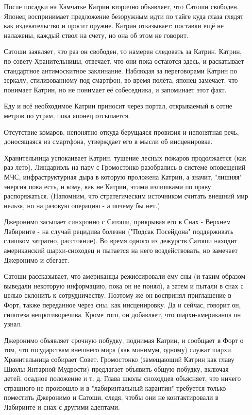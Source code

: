 {{После посадки на Камчатке Катрин вторично объявляет, что Сатоши свободен. Японец воспринимает предложение безоружным идти по тайге куда глаза глядят как издевательство и просит оружие. Катрин отказывает: поставки ещё не налажены, каждый ствол на счету, но она об этом не говорит.

Сатоши заявляет, что раз он свободен, то намерен следовать за Катрин. Катрин, по совету Хранительницы, отвечает, что они пока остаются здесь, и раскатывает стандартное антимоскитное заклинание. Наблюдая за переговорами Катрин по зеркалу, стилизованному под смартфон, во время полёта, японец замечает, что понимает Катрин, но не понимает её собеседника, и запоминает этот факт.

Еду и всё необходимое Катрин приносит через портал, открываемый в сотне метров по утрам, пока японец отсыпается.

Отсутствие комаров, непонятно откуда берущаяся провизия и непонятная речь, доносящаяся из смартфона, утверждает его в мысли об инсценировке.

Хранительница успокаивает Катрин: тушение лесных пожаров продолжается (как раз лето), Линдариэль на пару с Громостонко разобрались в системе оповещений МЧС, инфраструктурная дыра в которую проложена Катрин, а значит, "лишняя" энергия пока есть, и кому, как не Катрин, этими излишками по праву распоряжаться. (Напомним, что стратегическим источником считать внешний мир нельзя, но на разовую операцию - а почему бы нет.)


Джеронимо засыпает синхронно с Сатоши, прикрывая его в Снах - Верхнем Лабиринте - на случай рецидива болезни ("Подсак Посейдона" поддерживать слишком затратно, расстояние). Во время одного из дежурств Сатоши находит американский шархи-сноходец и пытается на него воздействовать, но замечает Джеронимо и сбегает.

Сатоши рассказывает, что американцы режиссировали ему сны (и таким образом выведали некоторую информацию, пока он не понял), а затем и пытали в снах с целью склонить к сотрудничеству. Поэтому же он воспринял приглашение в Форт, также переданное через сны, как инсценировку. Да и сейчас, говорит он, гипотеза непротиворечива. Кроме того, он добавляет, что шархи-американца он узнал.

Джеронимо объявляет срочную побудку, поднимая Катрин, и сообщает в Форт о том, что государствам внешнего мира (как минимум, одному) служат шархи.
Хранительница собирает Совет. Громостонко (замещающий Катрин как главу Школы Янтарной Мудрости) предлагает объявить общую побудку, включая детей, осадное положение и т. д. Глава школы сноходцев объясняет, что ничего страшного не произошло и в "лабиринтальный карантин" требуется только поместить Джеронимо и Сатоши, следя, чтобы они не контактировали в Лабиринте и снах с другими адептами.

}}
